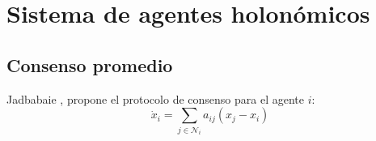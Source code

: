 \section{Sistema de agentes holonómicos}
\twocolumn
\subsection{Consenso promedio}
Jadbabaie \cite{jadbabaie2003coordination}, propone el protocolo de consenso para el agente $i$:
\begin{equation*}
    \dot{x}_i = \sum_{j \in \mathcal{N}_i} a_{ij}(x_j - x_i)
\end{equation*}
